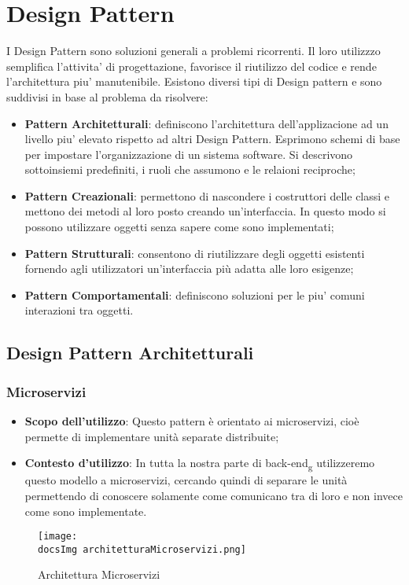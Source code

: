 \section{Design Pattern}
	I Design Pattern sono soluzioni generali a problemi ricorrenti. Il loro utilizzzo semplifica l'attivita' di progettazione, favorisce il riutilizzo del codice e rende l'architettura piu' manutenibile. Esistono diversi tipi di Design pattern e sono suddivisi in base al problema da risolvere:
	\begin{itemize}\itemsep1pt
		\item \textbf{Pattern Architetturali}: definiscono l'architettura dell'applizacione ad un livello piu' elevato rispetto ad altri Design Pattern. Esprimono schemi di base per impostare l'organizzazione di un sistema software. Si descrivono sottoinsiemi predefiniti, i ruoli che assumono e le relaioni reciproche; 
		\item \textbf{Pattern Creazionali}: permettono di nascondere i costruttori delle classi e mettono dei metodi al loro posto creando un'interfaccia. In questo modo si possono utilizzare oggetti senza sapere come sono implementati;
		\item \textbf{Pattern Strutturali}: consentono di riutilizzare degli oggetti esistenti fornendo agli utilizzatori un'interfaccia più adatta alle loro esigenze;
		\item \textbf{Pattern Comportamentali}: definiscono soluzioni per le piu' comuni interazioni tra oggetti.
	\end{itemize} 
	
	\subsection{Design Pattern Architetturali}
		\subsubsection{Microservizi}
			\begin{itemize}
				\item\textbf{Scopo dell'utilizzo}: Questo pattern è orientato ai microservizi, cioè permette di implementare unità separate distribuite;
				\item\textbf{Contesto d'utilizzo}: In tutta la nostra parte di back-end\textsubscript{g} utilizzeremo questo modello a microservizi, cercando quindi di separare le unità permettendo di conoscere solamente come comunicano tra di loro e non invece come sono implementate.
			\end{itemize}
			\begin{figure}
				\centering
				\texttt{[image: \\docsImg architetturaMicroservizi.png]}
				\caption{Architettura Microservizi}
				\label{Fig. Architettura a microservizi}
			\end{figure}

